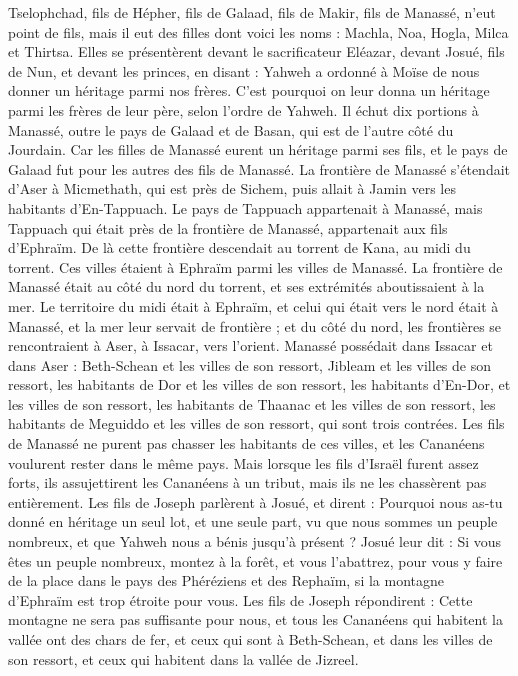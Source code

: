 \begin{multicols}{2}
Tselophchad, fils de Hépher, fils de Galaad, fils de Makir, fils de Manassé, n’eut point de fils, mais il eut des filles dont voici les noms : Machla, Noa, Hogla, Milca et Thirtsa.
Elles se présentèrent devant le sacrificateur Eléazar, devant Josué, fils de Nun, et devant les princes, en disant : Yahweh a ordonné à Moïse de nous donner un héritage parmi nos frères. C’est pourquoi on leur donna un héritage parmi les frères de leur père, selon l’ordre de Yahweh.
Il échut dix portions à Manassé, outre le pays de Galaad et de Basan, qui est de l’autre côté du Jourdain.
Car les filles de Manassé eurent un héritage parmi ses fils, et le pays de Galaad fut pour les autres des fils de Manassé.
La frontière de Manassé s’étendait d’Aser à Micmethath, qui est près de Sichem, puis allait à Jamin vers les habitants d’En-Tappuach.
Le pays de Tappuach appartenait à Manassé, mais Tappuach qui était près de la frontière de Manassé, appartenait aux fils d’Ephraïm.
De là cette frontière descendait au torrent de Kana, au midi du torrent. Ces villes étaient à Ephraïm parmi les villes de Manassé. La frontière de Manassé était au côté du nord du torrent, et ses extrémités aboutissaient à la mer.
Le territoire du midi était à Ephraïm, et celui qui était vers le nord était à Manassé, et la mer leur servait de frontière ; et du côté du nord, les frontières se rencontraient à Aser, à Issacar, vers l’orient.
Manassé possédait dans Issacar et dans Aser : Beth-Schean et les villes de son ressort, Jibleam et les villes de son ressort, les habitants de Dor et les villes de son ressort, les habitants d’En-Dor, et les villes de son ressort, les habitants de Thaanac et les villes de son ressort, les habitants de Meguiddo et les villes de son ressort, qui sont trois contrées.
Les fils de Manassé ne purent pas chasser les habitants de ces villes, et les Cananéens voulurent rester dans le même pays.
Mais lorsque les fils d’Israël furent assez forts, ils assujettirent les Cananéens à un tribut, mais ils ne les chassèrent pas entièrement.
Les fils de Joseph parlèrent à Josué, et dirent : Pourquoi nous as-tu donné en héritage un seul lot, et une seule part, vu que nous sommes un peuple nombreux, et que Yahweh nous a bénis jusqu’à présent ?
Josué leur dit : Si vous êtes un peuple nombreux, montez à la forêt, et vous l’abattrez, pour vous y faire de la place dans le pays des Phéréziens et des Rephaïm, si la montagne d’Ephraïm est trop étroite pour vous.
Les fils de Joseph répondirent : Cette montagne ne sera pas suffisante pour nous, et tous les Cananéens qui habitent la vallée ont des chars de fer, et ceux qui sont à Beth-Schean, et dans les villes de son ressort, et ceux qui habitent dans la vallée de Jizreel.

\end{multicols}
